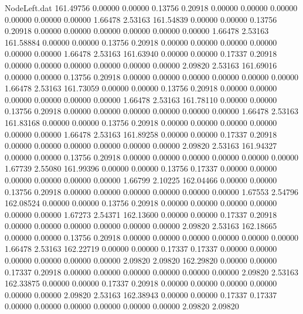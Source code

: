 \begin{filecontents}{NodeLeft.dat}
 161.49756    0.00000    0.00000     0.13756    0.20918    0.00000    0.00000    0.00000    0.00000    0.00000    0.00000    1.66478    2.53163
 161.54839    0.00000    0.00000     0.13756    0.20918    0.00000    0.00000    0.00000    0.00000    0.00000    0.00000    1.66478    2.53163
 161.58884    0.00000    0.00000     0.13756    0.20918    0.00000    0.00000    0.00000    0.00000    0.00000    0.00000    1.66478    2.53163
 161.63940    0.00000    0.00000     0.17337    0.20918    0.00000    0.00000    0.00000    0.00000    0.00000    0.00000    2.09820    2.53163
 161.69016    0.00000    0.00000     0.13756    0.20918    0.00000    0.00000    0.00000    0.00000    0.00000    0.00000    1.66478    2.53163
 161.73059    0.00000    0.00000     0.13756    0.20918    0.00000    0.00000    0.00000    0.00000    0.00000    0.00000    1.66478    2.53163
 161.78110    0.00000    0.00000     0.13756    0.20918    0.00000    0.00000    0.00000    0.00000    0.00000    0.00000    1.66478    2.53163
 161.83168    0.00000    0.00000     0.13756    0.20918    0.00000    0.00000    0.00000    0.00000    0.00000    0.00000    1.66478    2.53163
 161.89258    0.00000    0.00000     0.17337    0.20918    0.00000    0.00000    0.00000    0.00000    0.00000    0.00000    2.09820    2.53163
 161.94327    0.00000    0.00000     0.13756    0.20918    0.00000    0.00000    0.00000    0.00000    0.00000    0.00000    1.67739    2.55080
 161.99396    0.00000    0.00000     0.13756    0.17337    0.00000    0.00000    0.00000    0.00000    0.00000    0.00000    1.66799    2.10225
 162.04466    0.00000    0.00000     0.13756    0.20918    0.00000    0.00000    0.00000    0.00000    0.00000    0.00000    1.67553    2.54796
 162.08524    0.00000    0.00000     0.13756    0.20918    0.00000    0.00000    0.00000    0.00000    0.00000    0.00000    1.67273    2.54371
 162.13600    0.00000    0.00000     0.17337    0.20918    0.00000    0.00000    0.00000    0.00000    0.00000    0.00000    2.09820    2.53163
 162.18665    0.00000    0.00000     0.13756    0.20918    0.00000    0.00000    0.00000    0.00000    0.00000    0.00000    1.66478    2.53163
 162.22719    0.00000    0.00000     0.17337    0.17337    0.00000    0.00000    0.00000    0.00000    0.00000    0.00000    2.09820    2.09820
 162.29820    0.00000    0.00000     0.17337    0.20918    0.00000    0.00000    0.00000    0.00000    0.00000    0.00000    2.09820    2.53163
 162.33875    0.00000    0.00000     0.17337    0.20918    0.00000    0.00000    0.00000    0.00000    0.00000    0.00000    2.09820    2.53163
 162.38943    0.00000    0.00000     0.17337    0.17337    0.00000    0.00000    0.00000    0.00000    0.00000    0.00000    2.09820    2.09820

\end{filecontents}
